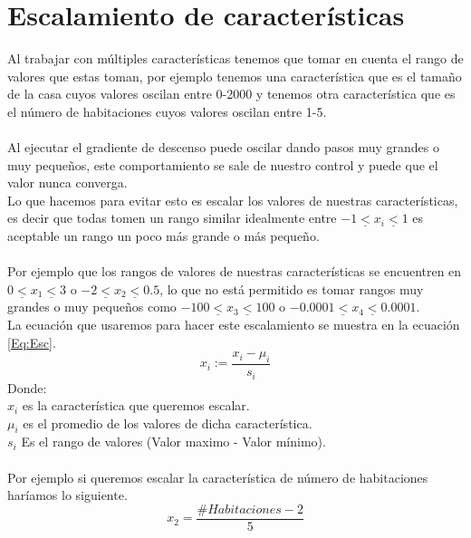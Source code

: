 \documentclass{book}
\begin{document}
\section{Escalamiento de características}
Al trabajar con múltiples características tenemos que tomar en cuenta el rango de valores que estas toman, por ejemplo tenemos una característica que es el tamaño de la casa cuyos valores oscilan entre 0-2000 y tenemos otra característica que es el número de habitaciones cuyos valores oscilan entre 1-5.\\\\Al ejecutar el gradiente de descenso puede oscilar dando pasos muy grandes o muy pequeños, este comportamiento se sale de nuestro control y puede que el valor nunca converga.\\Lo que hacemos para evitar esto es escalar los valores de nuestras características, es decir que todas tomen un rango similar idealmente entre $-1\underline{<} x_i \underline{<}1$ es aceptable un rango un poco más grande o más pequeño. \\\\Por ejemplo que los rangos de valores de nuestras características se encuentren en $0\underline{<}x_1\underline{<}3$ o $-2\underline{<}x_2\underline{<}0.5$, lo que no está permitido es tomar rangos muy grandes o muy pequeños como $-100\underline{<}x_3\underline{<}100$ o $-0.0001\underline{<}x_4\underline{<}0.0001$.\\La ecuación que usaremos para hacer este escalamiento se muestra en la ecuación \ref{Eq:Esc}.
\begin{equation}
	x_i:=\frac{x_i-\mu_i}{s_i}
	\label{Eq:Esc}
\end{equation}
Donde:\\$x_i$ es la característica que queremos escalar.\\$\mu_i$ es el promedio de los valores de dicha característica.\\
$s_i$ Es el rango de valores (Valor maximo - Valor mínimo).\\\\Por ejemplo si queremos escalar la característica de número de habitaciones haríamos lo siguiente.
\[
x_2=\frac{\#Habitaciones-2}{5}
\]
\end{document}
